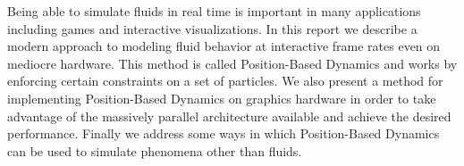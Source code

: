 Being able to simulate fluids in real time is important in many applications
including games and interactive visualizations. In this report we describe a
modern approach to modeling fluid behavior at interactive frame rates even on
mediocre hardware. This method is called Position-Based Dynamics and works by
enforcing certain constraints on a set of particles. We also present a method
for implementing Position-Based Dynamics on graphics hardware in order to take
advantage of the massively parallel architecture available and achieve the
desired performance. Finally we address some ways in which Position-Based
Dynamics can be used to simulate phenomena other than fluids.
